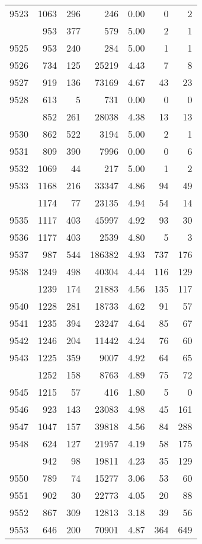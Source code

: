 \documentclass[
]{article}
\begin{document}
\begin{table}
\begin{tabular}[t]{lrrrrrr}
9523 & 1063 & 296 & 246 & 0.00 & 0 & 2\\
\addlinespace
9524 & 953 & 377 & 579 & 5.00 & 2 & 1\\
9525 & 953 & 240 & 284 & 5.00 & 1 & 1\\
9526 & 734 & 125 & 25219 & 4.43 & 7 & 8\\
9527 & 919 & 136 & 73169 & 4.67 & 43 & 23\\
9528 & 613 & 5 & 731 & 0.00 & 0 & 0\\
\addlinespace
9529 & 852 & 261 & 28038 & 4.38 & 13 & 13\\
9530 & 862 & 522 & 3194 & 5.00 & 2 & 1\\
9531 & 809 & 390 & 7996 & 0.00 & 0 & 6\\
9532 & 1069 & 44 & 217 & 5.00 & 1 & 2\\
9533 & 1168 & 216 & 33347 & 4.86 & 94 & 49\\
\addlinespace
9534 & 1174 & 77 & 23135 & 4.94 & 54 & 14\\
9535 & 1117 & 403 & 45997 & 4.92 & 93 & 30\\
9536 & 1177 & 403 & 2539 & 4.80 & 5 & 3\\
9537 & 987 & 544 & 186382 & 4.93 & 737 & 176\\
9538 & 1249 & 498 & 40304 & 4.44 & 116 & 129\\
\addlinespace
9539 & 1239 & 174 & 21883 & 4.56 & 135 & 117\\
9540 & 1228 & 281 & 18733 & 4.62 & 91 & 57\\
9541 & 1235 & 394 & 23247 & 4.64 & 85 & 67\\
9542 & 1246 & 204 & 11442 & 4.24 & 76 & 60\\
9543 & 1225 & 359 & 9007 & 4.92 & 64 & 65\\
\addlinespace
9544 & 1252 & 158 & 8763 & 4.89 & 75 & 72\\
9545 & 1215 & 57 & 416 & 1.80 & 5 & 0\\
9546 & 923 & 143 & 23083 & 4.98 & 45 & 161\\
9547 & 1047 & 157 & 39818 & 4.56 & 84 & 288\\
9548 & 624 & 127 & 21957 & 4.19 & 58 & 175\\
\addlinespace
9549 & 942 & 98 & 19811 & 4.23 & 35 & 129\\
9550 & 789 & 74 & 15277 & 3.06 & 53 & 60\\
9551 & 902 & 30 & 22773 & 4.05 & 20 & 88\\
9552 & 867 & 309 & 12813 & 3.18 & 39 & 56\\
9553 & 646 & 200 & 70901 & 4.87 & 364 & 649\\

\end{tabular}
\end{table}
\end{document}
